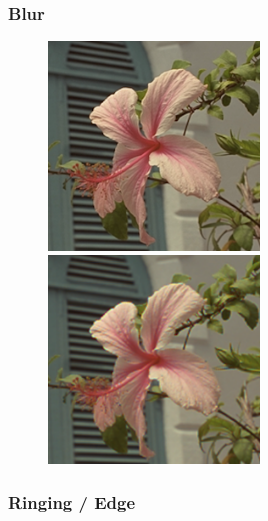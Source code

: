 {\subsubsection{Blur}

\begin{figure}[h]
\begin{center}
       \includegraphics[width=0.5\textwidth]{imagenes/img3_blur_original.png}
        \caption{}
        \end{center}
\endminipage
{}
\begin{center}
       \includegraphics[width=0.5\textwidth]{imagenes/img3_blur.png}
        \caption{}
         \end{center}
\endminipage
\end{figure}


\subsubsection{Ringing / Edge}

}
